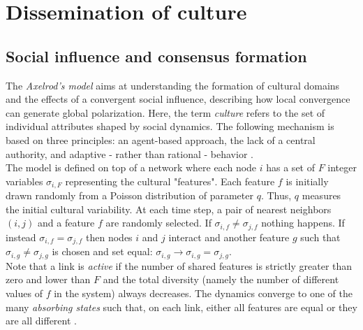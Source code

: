 \chapter{Dissemination of culture}
\label{ch:culture}

\section{Social influence and consensus formation}
The \emph{Axelrod's model} aims at understanding the formation of cultural domains and the effects of a convergent social influence, describing how local convergence can generate global polarization. Here, the term \emph{culture} refers to the set of individual attributes shaped by social dynamics. The following mechanism is based on three principles: an agent-based approach, the lack of a central authority, and adaptive - rather than rational - behavior \cite{axelrod1997dissemination}. \\
The model is defined on top of a network where each node $i$ has a set of $F$ integer variables $\sigma_{i, F}$ representing the cultural "features". Each feature $f$ is initially drawn randomly from a Poisson distribution of parameter $q$. Thus, $q$ measures the initial cultural variability. At each time step, a pair of nearest neighbors $(i, j)$ and a feature $f$ are randomly selected. If $\sigma_{i, f} \neq \sigma_{j, f}$ nothing happens. If instead $\sigma_{i, f} = \sigma_{j, f}$ then nodes $i$ and $j$ interact and another feature $g$ such that $\sigma_{i, g} \neq \sigma_{j, g}$ is chosen and set equal: $\sigma_{i, g} \to \sigma_{i, g} = \sigma_{j, g}$. \\
Note that a link is \emph{active} if the number of shared features is strictly greater than zero and lower than $F$ and the total diversity (namely the number of different values of $f$ in the system) always decreases. The dynamics converge to one of the many \emph{absorbing states} such that, on each link, either all features are equal or they are all different \cite{castellano2000nonequilibrium, miguel2005binary}. 

